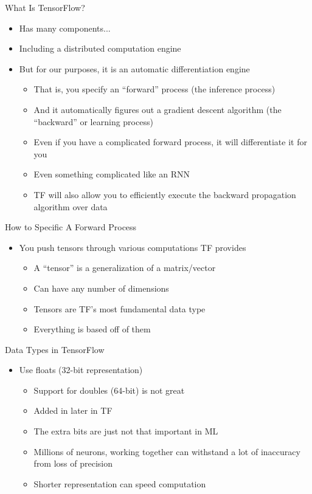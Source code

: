 \documentclass[aspectratio=169]{beamer}
\begin{document}
\begin{frame}{What Is TensorFlow?}

\begin{itemize}
	\item Has many components...
	\item Including a distributed computation engine
	\item But for our purposes, it is an automatic differentiation engine
        \begin{itemize}
                \item That is, you specify an ``forward'' process (the inference process)
		\item And it automatically figures out a gradient descent algorithm (the ``backward'' or learning process)
		\item Even if you have a complicated forward process, it will differentiate it for you
		\item Even something complicated like an RNN
		\item TF will also allow you to efficiently execute the backward propagation algorithm over data
        \end{itemize}
\end{itemize}

\end{frame}
\begin{frame}{How to Specific A Forward Process}

\begin{itemize}
\item You push tensors through various computations TF provides
	\begin{itemize}
	\item A ``tensor'' is a generalization of a matrix/vector
	\item Can have any number of dimensions 
	\item Tensors are TF's most fundamental data type
	\item Everything is based off of them
	\end{itemize}
\end{itemize}
\end{frame}
\begin{frame}{Data Types in TensorFlow}

\begin{itemize}
\item Use floats (32-bit representation)
	\begin{itemize}
	\item Support for doubles (64-bit) is not great
	\item Added in later in TF
	\item The extra bits are just not that important in ML
	\item Millions of neurons, working together can withstand a lot of inaccuracy from loss of precision
	\item Shorter representation can speed computation
	\end{itemize}
\end{itemize}
\end{frame}
\end{document}
